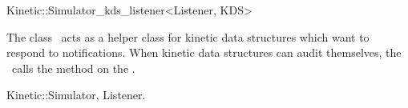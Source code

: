 

\begin{ccRefClass}{Kinetic::Simulator_kds_listener<Listener, KDS>}  %


\ccDefinition
  
The class \ccRefName\ acts as a helper class for kinetic data
structures which want to respond to
 notifications. When kinetic
data structures can audit themselves, the \ccRefName\ calls the
 method on the .



\ccCreation
{}  %


\ccSeeAlso

Kinetic::Simulator, Listener.



\end{ccRefClass}


